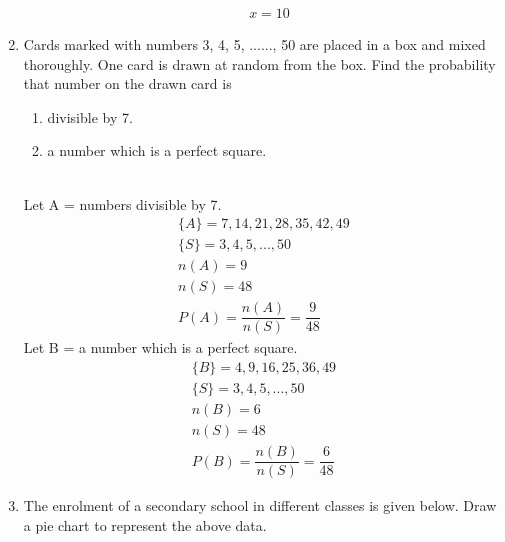 \documentclass[journal,12pt,twocolumn]{IEEEtran}
\renewcommand\thesection{\arabic{section}}
\begin{document}
\begin{enumerate}[label=\thesection.\arabic*.,ref=\thesection.\theenumi]
\begin{align}
 & x = 10 
 \end{align}
 \item Cards marked with numbers 3, 4, 5, ......, 50 are placed in a box and mixed thoroughly. One card is drawn at random from the box. Find the probability that number on the drawn card is
\begin{enumerate}
\item divisible by 7.
\item a number which is a perfect square.
\end{enumerate}
\solution\\
Let A = numbers divisible by 7.\\
\begin{align}
\{A\} = {7,14,21,28,35,42,49}\\
\{S\} = {3,4,5, ...,50}\\
n(A) = 9\\
n(S) = 48\\
P(A) =\dfrac{n(A)}{n(S)} = \dfrac{9}{48}
\end{align}
Let B = a number which is a perfect square.\\
\begin{align}
\{B\} = {4,9,16,25,36,49}\\
\{S\} = {3,4,5, ...,50}\\
n(B) = 6\\
n(S) = 48\\
P(B) =\dfrac{n(B)}{n(S)} = \dfrac{6}{48}
\end{align}
\item The enrolment of a secondary school in different classes is given below. Draw a pie chart to represent the above data.\\
 \begin{table}[htb]
 \centering
 \caption{}
 \end{table}
\solution\\
\begin{figure}[H]
	\centering

\end{figure}
\end{enumerate}
\end{document}
